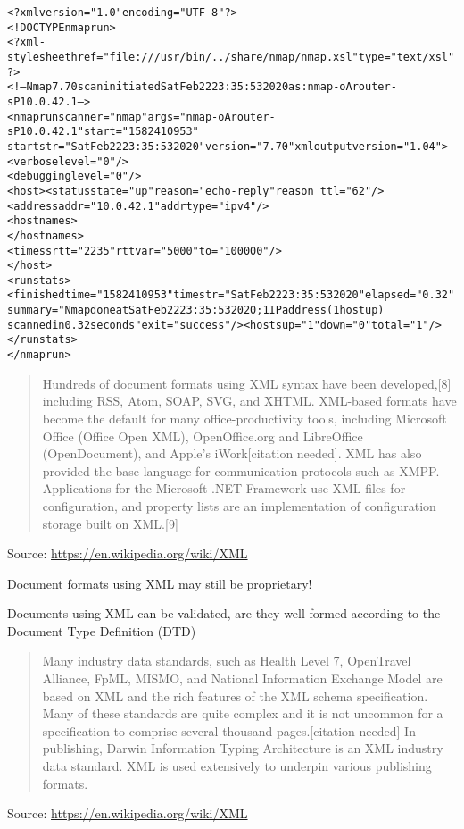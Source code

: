 \documentclass[Screen16to9,17pt]{foils}
\begin{document}

\begin{alltt}\footnotesize
  <?xml version="1.0" encoding="UTF-8"?>
  <!DOCTYPE nmaprun>
  <?xml-stylesheet href="file:///usr/bin/../share/nmap/nmap.xsl" type="text/xsl"?>
  <!-- Nmap 7.70 scan initiated Sat Feb 22 23:35:53 2020 as: nmap -oA router -sP 10.0.42.1 -->
  <nmaprun scanner="nmap" args="nmap -oA router -sP 10.0.42.1" start="1582410953"
   startstr="Sat Feb 22 23:35:53 2020" version="7.70" xmloutputversion="1.04">
  <verbose level="0"/>
  <debugging level="0"/>
  <host><status state="up" reason="echo-reply" reason_ttl="62"/>
  <address addr="10.0.42.1" addrtype="ipv4"/>
  <hostnames>
  </hostnames>
  <times srtt="2235" rttvar="5000" to="100000"/>
  </host>
  <runstats><finished time="1582410953" timestr="Sat Feb 22 23:35:53 2020" elapsed="0.32"
   summary="Nmap done at Sat Feb 22 23:35:53 2020; 1 IP address (1 host up)
   scanned in 0.32 seconds" exit="success"/><hosts up="1" down="0" total="1"/>
  </runstats>
  </nmaprun>

\end{alltt}



\begin{quote}
Hundreds of document formats using XML syntax have been developed,[8] including RSS, Atom, SOAP, SVG, and XHTML. XML-based formats have become the default for many office-productivity tools, including Microsoft Office (Office Open XML), OpenOffice.org and LibreOffice (OpenDocument), and Apple's iWork[citation needed]. XML has also provided the base language for communication protocols such as XMPP. Applications for the Microsoft .NET Framework use XML files for configuration, and property lists are an implementation of configuration storage built on XML.[9]
\end{quote}
Source: \url{https://en.wikipedia.org/wiki/XML}

\begin{list2}
\item Document formats using XML may still be proprietary!
\item Documents using XML can be validated, are they well-formed according to the Document Type Definition (DTD)
\end{list2}


\begin{quote}
Many industry data standards, such as Health Level 7, OpenTravel Alliance, FpML, MISMO, and National Information Exchange Model are based on XML and the rich features of the XML schema specification. Many of these standards are quite complex and it is not uncommon for a specification to comprise several thousand pages.[citation needed] In publishing, Darwin Information Typing Architecture is an XML industry data standard. XML is used extensively to underpin various publishing formats.
\end{quote}
Source: \url{https://en.wikipedia.org/wiki/XML}
\end{document}
